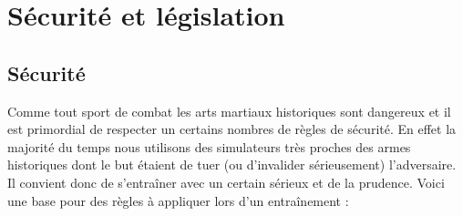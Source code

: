 \chapter{Sécurité et législation}


\section{Sécurité}


Comme tout sport de combat les arts martiaux historiques sont dangereux et il est primordial de respecter un certains nombres de règles de sécurité.
En effet la majorité du temps nous utilisons des simulateurs très proches des armes historiques dont le but étaient de tuer (ou d'invalider sérieusement) l'adversaire.
Il convient donc de s'entraîner avec un certain sérieux et de la prudence.
Voici une base pour des règles à appliquer lors d'un entraînement :
